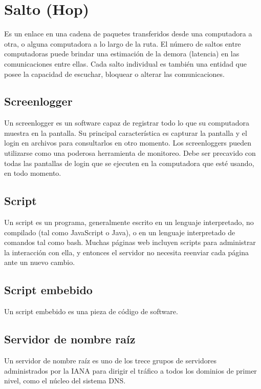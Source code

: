 \section{Salto (Hop)}\label{salto-hop}

Es un enlace en una cadena de paquetes transferidos desde una
computadora a otra, o alguna computadora a lo largo de la ruta. El
número de saltos entre computadoras puede brindar una estimación de la
demora (latencia) en las comunicaciones entre ellas. Cada salto
individual es también una entidad que posee la capacidad de escuchar,
bloquear o alterar las comunicaciones.

\subsection{Screenlogger}\label{screenlogger}

Un screenlogger es un software capaz de registrar todo lo que su
computadora muestra en la pantalla. Su principal característica es
capturar la pantalla y el login en archivos para consultarlos en otro
momento. Los screenloggers pueden utilizarse como una poderosa
herramienta de monitoreo. Debe ser precavido con todas las pantallas de
login que se ejecuten en la computadora que esté usando, en todo
momento.

\subsection{Script}\label{script}

Un script es un programa, generalmente escrito en un lenguaje
interpretado, no compilado (tal como JavaScript o Java), o en un
lenguaje interpretado de comandos tal como bash. Muchas páginas web
incluyen scripts para administrar la interacción con ella, y entonces el
servidor no necesita reenviar cada página ante un nuevo cambio.

\subsection{Script embebido}\label{script-embebido}

Un script embebido es una pieza de código de software.

\subsection{Servidor de nombre raíz}\label{servidor-de-nombre-rauxedz}

Un servidor de nombre raíz es uno de los trece grupos de servidores
administrados por la IANA para dirigir el tráfico a todos los dominios
de primer nivel, como el núcleo del sistema DNS.

